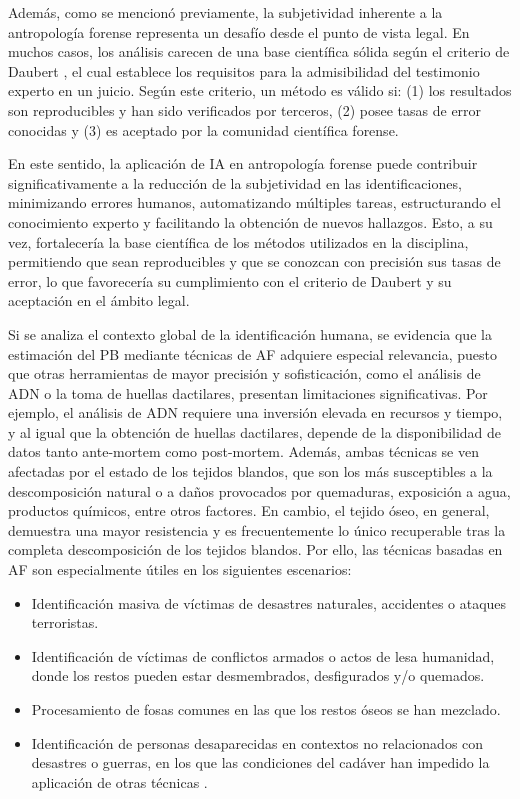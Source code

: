 Además, como se mencionó previamente, la subjetividad inherente a la antropología forense representa un desafío desde el punto de vista legal. En muchos casos, los análisis carecen de una base científica sólida según el criterio de Daubert \cite{noauthor_daubert_nodate}, el cual establece los requisitos para la admisibilidad del testimonio experto en un juicio. Según este criterio, un método es válido si: (1) los resultados son reproducibles y han sido verificados por terceros, (2) posee tasas de error conocidas y (3) es aceptado por la comunidad científica forense.

En este sentido, la aplicación de IA en antropología forense puede contribuir significativamente a la reducción de la subjetividad en las identificaciones, minimizando errores humanos, automatizando múltiples tareas, estructurando el conocimiento experto y facilitando la obtención de nuevos hallazgos. Esto, a su vez, fortalecería la base científica de los métodos utilizados en la disciplina, permitiendo que sean reproducibles y que se conozcan con precisión sus tasas de error, lo que favorecería su cumplimiento con el criterio de Daubert y su aceptación en el ámbito legal.

Si se analiza el contexto global de la identificación humana, se evidencia que la estimación del PB mediante técnicas de AF adquiere especial relevancia, puesto que otras herramientas de mayor precisión y sofisticación, como el análisis de ADN o la toma de huellas dactilares, presentan limitaciones significativas. Por ejemplo, el análisis de ADN requiere una inversión elevada en recursos y tiempo, y al igual que la obtención de huellas dactilares, depende de la disponibilidad de datos tanto ante-mortem como post-mortem. Además, ambas técnicas se ven afectadas por el estado de los tejidos blandos, que son los más susceptibles a la descomposición natural o a daños provocados por quemaduras, exposición a agua, productos químicos, entre otros factores. En cambio, el tejido óseo, en general, demuestra una mayor resistencia y es frecuentemente lo único recuperable tras la completa descomposición de los tejidos blandos. Por ello, las técnicas basadas en AF son especialmente útiles en los siguientes escenarios:
\begin{itemize}
    \item Identificación masiva de víctimas de desastres naturales, accidentes o ataques terroristas.
    \item Identificación de víctimas de conflictos armados o actos de lesa humanidad, donde los restos pueden estar desmembrados, desfigurados y/o quemados.
    \item Procesamiento de fosas comunes en las que los restos óseos se han mezclado.
    \item Identificación de personas desaparecidas en contextos no relacionados con desastres o guerras, en los que las condiciones del cadáver han impedido la aplicación de otras técnicas \cite{byers_introduction_2016}.
\end{itemize}


